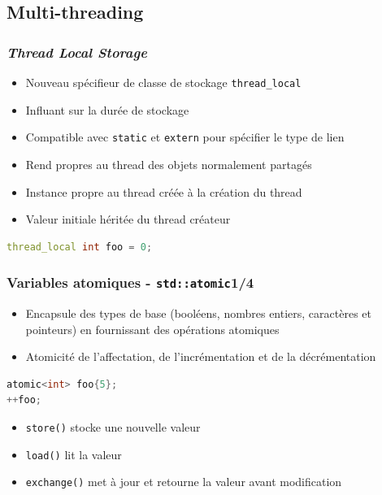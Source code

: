\documentclass[C++.tex]{subfiles}
\begin{document}
\subsection*{Multi-threading}
\begin{frame}[fragile]
	\frametitle{\textit{Thread Local Storage}}
	\begin{itemize}
		\item Nouveau \og spécifieur de classe de stockage\fg{} \lstinline|thread_local|
		\item Influant sur la durée de stockage
		\item Compatible avec \lstinline|static| et \lstinline|extern| pour spécifier le type de lien
		\item Rend propres au thread des objets normalement partagés


		\item Instance propre au thread créée à la création du thread
		\item Valeur initiale héritée du thread créateur
	\end{itemize}

	\begin{lstlisting}[language=C++]
thread_local int foo = 0;\end{lstlisting}
\end{frame}

\begin{frame}[fragile]
	\frametitle{Variables atomiques - \lstinline|std::atomic|\titlehfill{}1/4}
	\begin{itemize}
		\item Encapsule des types de base (booléens, nombres entiers, caractères et pointeurs) en fournissant des opérations atomiques
		\item Atomicité de l'affectation, de l'incrémentation et de la décrémentation
	\end{itemize}

	\begin{lstlisting}[language=C++]
atomic<int> foo{5};
++foo; \end{lstlisting}

	\begin{itemize}
		\item \lstinline|store()| stocke une nouvelle valeur
		\item \lstinline|load()| lit la valeur
		\item \lstinline|exchange()| met à jour et retourne la valeur avant modification
	\end{itemize}
\end{frame}
\end{document}
